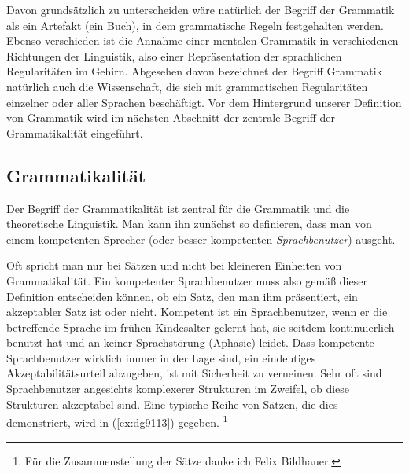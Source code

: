 Davon grundsätzlich zu unterscheiden wäre natürlich der Begriff der Grammatik als ein Artefakt (\zB ein Buch), in dem grammatische Regeln festgehalten werden.
Ebenso verschieden ist die Annahme einer mentalen Grammatik in verschiedenen Richtungen der Linguistik, also einer Repräsentation der sprachlichen Regularitäten im Gehirn.
Abgesehen davon bezeichnet der Begriff Grammatik natürlich auch die Wissenschaft, die sich mit grammatischen Regularitäten einzelner oder aller Sprachen beschäftigt.
Vor dem Hintergrund unserer Definition von Grammatik wird im nächsten Abschnitt der zentrale Begriff der Grammatikalität eingeführt.

\subsection{Grammatikalität}

\label{sec:grammungramm}
\label{sec:grammatikalitaet}


Der Begriff der Grammatikalität ist zentral für die Grammatik und die theoretische Linguistik.
Man kann ihn zunächst so definieren, dass man von einem kompetenten Sprecher (oder besser kompetenten \textit{Sprachbenutzer}) ausgeht.


\enlargethispage{1\baselineskip}
Oft spricht man nur bei Sätzen und nicht bei kleineren Einheiten von Grammatikalität.
Ein kompetenter Sprachbenutzer muss also gemäß dieser Definition entscheiden können, ob ein Satz, den man ihm präsentiert, ein akzeptabler Satz ist oder nicht.
Kompetent ist ein Sprachbenutzer, wenn er die betreffende Sprache im frühen Kindesalter gelernt hat, sie seitdem kontinuierlich benutzt hat und an keiner Sprachstörung (Aphasie) leidet.
Dass kompetente Sprachbenutzer wirklich immer in der Lage sind, ein eindeutiges Akzeptabilitätsurteil abzugeben, ist mit Sicherheit zu verneinen.
Sehr oft sind Sprachbenutzer angesichts komplexerer Strukturen im Zweifel, ob diese Strukturen akzeptabel sind.
Eine typische Reihe von Sätzen, die dies demonstriert, wird in (\ref{ex:dg9113}) gegeben.%
\footnote{Für die Zusammenstellung der Sätze danke ich Felix Bildhauer.}

